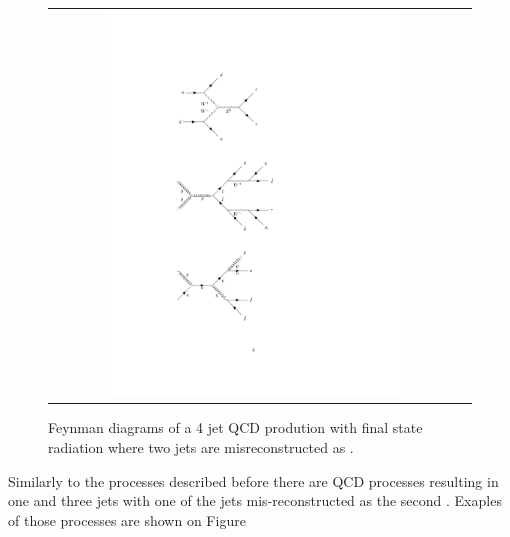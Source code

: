 \begin{figure}[tbh!]
	\centering
	\begin{tabular}{cc}
		\includegraphics[width=0.75\textwidth]{diagrams/pics/background_QCDfinrad.pdf}
	\end{tabular}
	\caption{Feynman diagrams of a 4 jet QCD prodution with final state radiation where two jets are misreconstructed as \hadtau. }
	\label{fig:background_QCDfinrad}
\end{figure}

Similarly to the processes described before there are QCD processes resulting in one \hadtau and three jets with one of the jets mis-reconstructed as the second \hadtau. Exaples of those processes are shown on Figure

